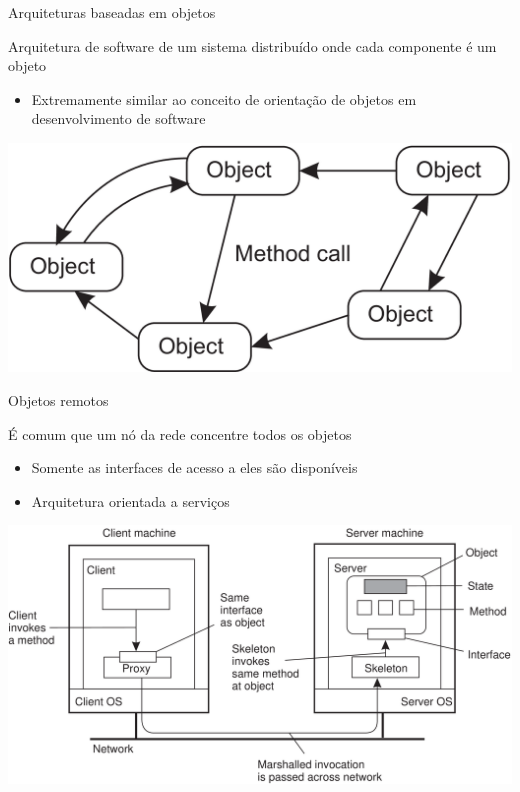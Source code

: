 \documentclass[compress]{beamer}
\begin{document}
\begin{frame}{Arquiteturas baseadas em objetos}

Arquitetura de software de um sistema distribuído onde cada componente é um objeto
\begin{itemize}
    \item Extremamente similar ao conceito de orientação de objetos em desenvolvimento de software
\end{itemize}

\vspace{0.5cm}

\centering\includegraphics[width=\textwidth]{images/arquitetura_objetos.png}
\end{frame}


\begin{frame}{Objetos remotos}

É comum que um nó da rede concentre todos os objetos
\begin{itemize}
    \item Somente as interfaces de acesso a eles são disponíveis
    \item Arquitetura orientada a serviços
\end{itemize}

\vspace{0.2cm}

\centering\includegraphics[width=\textwidth]{images/objetos_distribuidos.png}

\end{frame}
\end{document}
